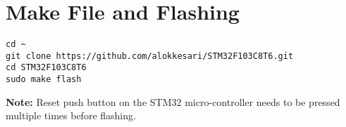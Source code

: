 \documentclass[journal,12pt,twocolumn]{IEEEtran}
\begin{document}
\section{Make File and Flashing}
\begin{lstlisting}
cd ~
git clone https://github.com/alokkesari/STM32F103C8T6.git
cd STM32F103C8T6
sudo make flash
\end{lstlisting}
%
%
%
%
% 
%
%
%
% 
%
%
\textbf{Note:} Reset push button on the STM32 micro-controller needs to be pressed multiple times before flashing.
\end{document}
